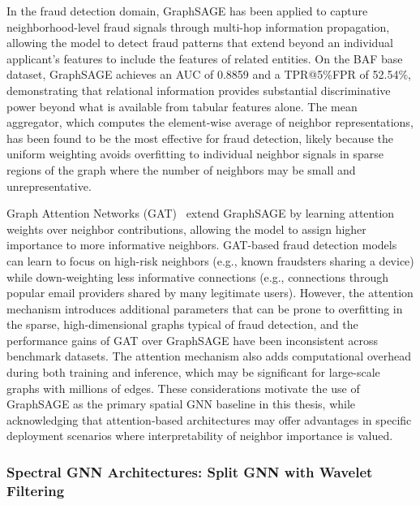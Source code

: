 In the fraud detection domain, GraphSAGE has been applied to capture
neighborhood-level fraud signals through multi-hop information propagation,
allowing the model to detect fraud patterns that extend beyond an individual
applicant's features to include the features of related entities. On the BAF
base dataset, GraphSAGE achieves an AUC of 0.8859 and a TPR@5\%FPR of 52.54\%,
demonstrating that relational information provides substantial discriminative
power beyond what is available from tabular features alone. The mean aggregator,
which computes the element-wise average of neighbor representations, has been
found to be the most effective for fraud detection, likely because the uniform
weighting avoids overfitting to individual neighbor signals in sparse regions of
the graph where the number of neighbors may be small and unrepresentative.

Graph Attention Networks (GAT)~\cite{velivckovic2018graph} extend GraphSAGE by
learning attention weights over neighbor contributions, allowing the model to
assign higher importance to more informative neighbors. GAT-based fraud
detection models can learn to focus on high-risk neighbors (e.g., known
fraudsters sharing a device) while down-weighting less informative connections
(e.g., connections through popular email providers shared by many legitimate
users). However, the attention mechanism introduces additional parameters that
can be prone to overfitting in the sparse, high-dimensional graphs typical of
fraud detection, and the performance gains of GAT over GraphSAGE have been
inconsistent across benchmark datasets. The attention mechanism also adds
computational overhead during both training and inference, which may be
significant for large-scale graphs with millions of edges. These considerations
motivate the use of GraphSAGE as the primary spatial GNN baseline in this
thesis, while acknowledging that attention-based architectures may offer
advantages in specific deployment scenarios where interpretability of neighbor
importance is valued.

\subsubsection{Spectral GNN Architectures: Split GNN with Wavelet Filtering}

